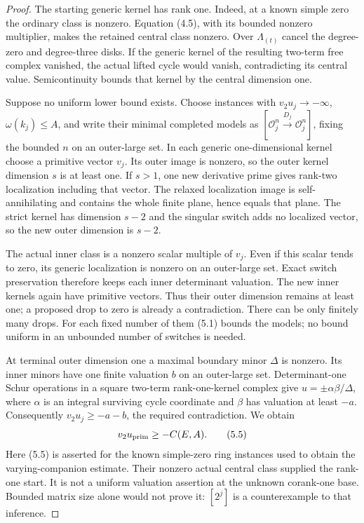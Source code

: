 \documentclass[11pt]{article}
\theoremstyle{definition}
\theoremstyle{remark}
\providecommand{\mathscr}[1]{\mathcal{#1}}
\begin{document}
\begin{proof}\leavevmode
The starting generic kernel has rank one. Indeed, at a known simple
zero the ordinary class is nonzero. Equation (4.5), with its bounded
nonzero multiplier, makes the retained central class nonzero.
Over $\Lambda_{(t)}$ cancel the degree-zero and degree-three disks.
If the generic kernel of the resulting two-term free complex vanished,
the actual lifted cycle would vanish, contradicting its central value.
Semicontinuity bounds that kernel by the central dimension one.

Suppose no uniform lower bound exists. Choose instances with
$v_2u_j\to-\infty$, $\omega(k_j)\le A$, and write their minimal
completed models as $[\mathscr O_j^n\xrightarrow{D_j}\mathscr O_j^n]$,
fixing the bounded $n$ on an outer-large set. In each generic
one-dimensional kernel choose a primitive vector $v_j$.
Its outer image is nonzero, so the outer kernel dimension $s$ is
at least one. If $s>1$, one new derivative prime gives rank-two
localization including that vector. The relaxed localization image
is self-annihilating and contains the whole finite plane, hence equals
that plane. The strict kernel has dimension $s-2$ and the singular
switch adds no localized vector, so the new outer dimension is $s-2$.

The actual inner class is a nonzero scalar multiple of $v_j$.
Even if this scalar tends to zero, its generic localization is nonzero
on an outer-large set. Exact switch preservation therefore keeps
each inner determinant valuation. The new inner kernels again have
primitive vectors. Thus their outer dimension remains at least one;
a proposed drop to zero is already a contradiction.
There can be only finitely many drops. For each fixed number of them
(5.1) bounds the models; no bound uniform in an unbounded number of
switches is needed.

At terminal outer dimension one a maximal boundary minor $\Delta$
is nonzero. Its inner minors have one finite valuation $b$ on an
outer-large set. Determinant-one Schur operations in a square
two-term rank-one-kernel complex give
$u=\pm\alpha\beta/\Delta$, where $\alpha$ is an integral surviving
cycle coordinate and $\beta$ has valuation at least $-a$.
Consequently $v_2u_j\ge-a-b$, the required contradiction. We obtain
\[
                     v_2u_{\rm prim}\ge-C(E,A).                 \tag{5.5}
\]
Here (5.5) is asserted for the known simple-zero ring instances
used to obtain the varying-companion estimate. Their nonzero actual
central class supplied the rank-one start. It is not a uniform
valuation assertion at the unknown corank-one base.
Bounded matrix size alone would not prove it: $[2^j]$ is a
counterexample to that inference.


\end{proof}
\end{document}
